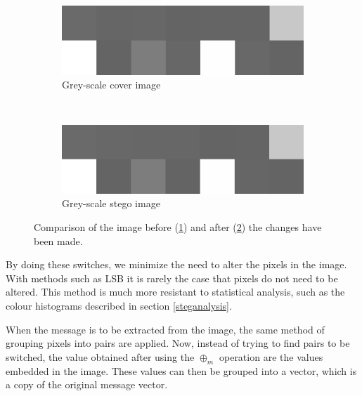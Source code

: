 \begin{figure}[h!]
    \centering
    \begin{subfigure}[b]{0.45\textwidth}
        \includegraphics[width=\textwidth, frame]{figures/pixelgrid.png}
		\caption{Grey-scale cover image}
		\label{fig:startingImageComp}
    \end{subfigure}
    ~ %
    \begin{subfigure}[b]{0.45\textwidth}
        \includegraphics[width=\textwidth, frame]{figures/pixelgrid2.png}
		\caption{Grey-scale stego image}
		\label{fig:endingImageComp}
    \end{subfigure}
    \caption{Comparison of the image before (\ref{fig:startingImageComp}) and after (\ref{fig:endingImageComp}) the changes have been made.}\label{fig:pixelGrids}
\end{figure}

By doing these switches, we minimize the need to alter the pixels in the image.
With methods such as LSB it is rarely the case that pixels do not need to be altered.
This method is much more resistant to statistical analysis, such as the colour histograms described in section \ref{steganalysis}.

When the message is to be extracted from the image, the same method of grouping pixels into pairs are applied.
Now, instead of trying to find pairs to be switched, the value obtained after using the $\oplus_m$ operation are the values embedded in the image.
These values can then be grouped into a vector, which is a copy of the original message vector.